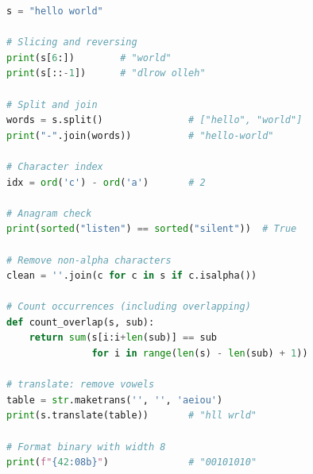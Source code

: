\begin{lstlisting}[language=Python]
s = "hello world"

# Slicing and reversing
print(s[6:])        # "world"
print(s[::-1])      # "dlrow olleh"

# Split and join
words = s.split()               # ["hello", "world"]
print("-".join(words))          # "hello-world"

# Character index
idx = ord('c') - ord('a')       # 2

# Anagram check
print(sorted("listen") == sorted("silent"))  # True

# Remove non-alpha characters
clean = ''.join(c for c in s if c.isalpha())

# Count occurrences (including overlapping)
def count_overlap(s, sub):
    return sum(s[i:i+len(sub)] == sub
               for i in range(len(s) - len(sub) + 1))

# translate: remove vowels
table = str.maketrans('', '', 'aeiou')
print(s.translate(table))       # "hll wrld"

# Format binary with width 8
print(f"{42:08b}")              # "00101010"
\end{lstlisting}